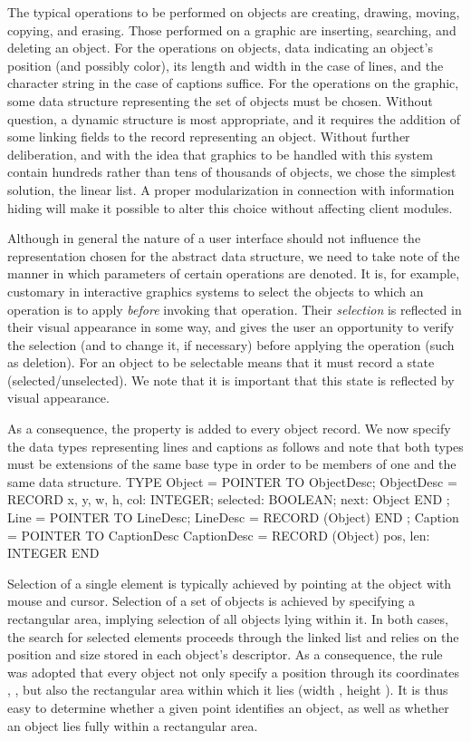 The typical operations to be performed on objects are creating, drawing, moving, copying, and erasing. Those performed on a graphic are inserting, searching, and deleting an object. For the operations on objects, data indicating an object's position (and possibly color), its length and width in the case of lines, and the character string in the case of captions suffice. For the operations on the graphic, some data structure representing the set of objects must be chosen. Without question, a dynamic structure is most appropriate, and it requires the addition of some linking fields to the record representing an object. Without further deliberation, and with the idea that graphics to be handled with this system contain hundreds rather than tens of thousands of objects, we chose the simplest solution, the linear list. A proper modularization in connection with information hiding will make it possible to alter this choice without affecting client modules.

Although in general the nature of a user interface should not influence the representation chosen for the abstract data structure, we need to take note of the manner in which parameters of certain operations are denoted. It is, for example, customary in interactive graphics systems to select the objects to which an operation is to apply \emph{before} invoking that operation. Their \emph{selection} is reflected in their visual appearance in some way, and gives the user an opportunity to verify the selection (and to change it, if necessary) before applying the operation (such as deletion). For an object to be selectable means that it must record a state (selected/unselected). We note that it is important that this state is reflected by visual appearance.

As a consequence, the property  is added to every object record. We now specify the data types representing lines and captions as follows and note that both types must be extensions of the same base type in order to be members of one and the same data structure.
\begintt
TYPE Object =   POINTER TO ObjectDesc;
  ObjectDesc =  RECORD
                  x, y, w, h, col: INTEGER;
                  selected: BOOLEAN;
                  next: Object
                END ;
  Line =        POINTER TO LineDesc;
  LineDesc =    RECORD (Object) END ;
  Caption =     POINTER TO CaptionDesc
  CaptionDesc = RECORD (Object)
                  pos, len: INTEGER
                END
\endtt

\noindent Selection of a single element is typically achieved by pointing at the object with mouse and cursor. Selection of a set of objects is achieved by specifying a rectangular area, implying selection of all objects lying within it. In both cases, the search for selected elements proceeds through the linked list and relies on the position and size stored in each object's descriptor. As a consequence, the rule was adopted that every object not only specify a position through its coordinates , , but also the rectangular area within which it lies (width , height ). It is thus easy to determine whether a given point identifies an object, as well as whether an object lies fully within a rectangular area.

